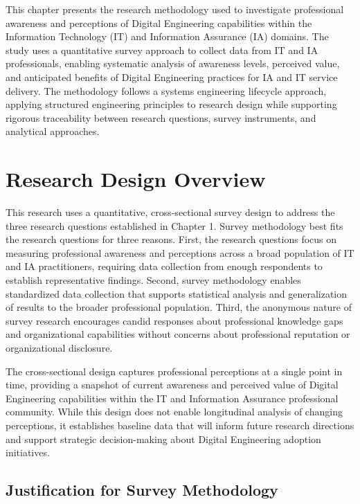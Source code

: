 \label{chap:Chapter_3}



This chapter presents the research methodology used to investigate professional awareness and perceptions of Digital Engineering capabilities within the Information Technology (IT) and Information Assurance (IA) domains. The study uses a quantitative survey approach to collect data from IT and IA professionals, enabling systematic analysis of awareness levels, perceived value, and anticipated benefits of Digital Engineering practices for IA and IT service delivery. The methodology follows a systems engineering lifecycle approach, applying structured engineering principles to research design while supporting rigorous traceability between research questions, survey instruments, and analytical approaches.

\section{Research Design Overview}

This research uses a quantitative, cross-sectional survey design to address the three research questions established in Chapter 1. Survey methodology best fits the research questions for three reasons. First, the research questions focus on measuring professional awareness and perceptions across a broad population of IT and IA practitioners, requiring data collection from enough respondents to establish representative findings. Second, survey methodology enables standardized data collection that supports statistical analysis and generalization of results to the broader professional population. Third, the anonymous nature of survey research encourages candid responses about professional knowledge gaps and organizational capabilities without concerns about professional reputation or organizational disclosure.

The cross-sectional design captures professional perceptions at a single point in time, providing a snapshot of current awareness and perceived value of Digital Engineering capabilities within the IT and Information Assurance professional community. While this design does not enable longitudinal analysis of changing perceptions, it establishes baseline data that will inform future research directions and support strategic decision-making about Digital Engineering adoption initiatives.

\subsection{Justification for Survey Methodology}

